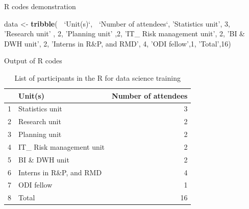 \documentclass[ignorenonframetext,]{beamer}
\newenvironment{Shaded}{\begin{snugshade}}{\end{snugshade}}
\newcommand{\DataTypeTok}[1]{\textcolor[rgb]{0.13,0.29,0.53}{#1}}
\newcommand{\DecValTok}[1]{\textcolor[rgb]{0.00,0.00,0.81}{#1}}
\newcommand{\KeywordTok}[1]{\textcolor[rgb]{0.13,0.29,0.53}{\textbf{#1}}}
\newcommand{\NormalTok}[1]{#1}
\newcommand{\OperatorTok}[1]{\textcolor[rgb]{0.81,0.36,0.00}{\textbf{#1}}}
\newcommand{\StringTok}[1]{\textcolor[rgb]{0.31,0.60,0.02}{#1}}
\begin{document}
\begin{frame}[fragile]{R codes demonstration}
\protect\hypertarget{r-codes-demonstration}{}

\begin{Shaded}
\begin{Highlighting}[]
\NormalTok{data <-}\StringTok{ }\KeywordTok{tribble}\NormalTok{(}
  \OperatorTok{~}\StringTok{`}\DataTypeTok{Unit(s)}\StringTok{`}\NormalTok{,}\OperatorTok{~}\StringTok{  `}\DataTypeTok{Number of attendees}\StringTok{`}\NormalTok{,}
\StringTok{'Statistics unit'}\NormalTok{, }\DecValTok{3}\NormalTok{,}
\StringTok{'Research unit'}\NormalTok{ , }\DecValTok{2}\NormalTok{,}
\StringTok{'Planning unit'}\NormalTok{ ,}\DecValTok{2}\NormalTok{,}
\StringTok{'IT_ Risk management unit'}\NormalTok{, }\DecValTok{2}\NormalTok{,}
\StringTok{'BI & DWH unit'}\NormalTok{,    }\DecValTok{2}\NormalTok{,}
\StringTok{'Interns in R&P, and RMD'}\NormalTok{, }\DecValTok{4}\NormalTok{,}
\StringTok{'ODI fellow'}\NormalTok{,}\DecValTok{1}\NormalTok{,}
\StringTok{'Total'}\NormalTok{,}\DecValTok{16}\NormalTok{)}
\end{Highlighting}
\end{Shaded}

\end{frame}

\begin{frame}{Output of R codes}
\protect\hypertarget{output-of-r-codes}{}

\begin{table}[ht]
\centering
\caption{List of participants in the R for data science training} 
\begin{tabular}{rlr}
  \hline
 & Unit(s) & Number of attendees \\ 
  \hline
1 & Statistics unit & 3 \\ 
  2 & Research unit & 2 \\ 
  3 & Planning unit & 2 \\ 
  4 & IT\_ Risk management unit & 2 \\ 
  5 & BI \& DWH unit & 2 \\ 
  6 & Interns in R\&P, and RMD & 4 \\ 
  7 & ODI fellow & 1 \\ 
  8 & Total & 16 \\ 
   \hline
\end{tabular}
\end{table}

\end{frame}
\end{document}
